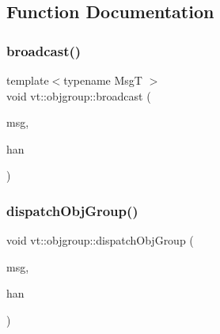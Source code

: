 \subsection{Function Documentation}
\mbox{\label{namespacevt_1_1objgroup_a1e6ef433bb1132944aba030b2a48d12d}} 
\subsubsection{\texorpdfstring{broadcast()}{broadcast()}}
{\footnotesize\ttfamily template$<$typename MsgT $>$ \\
void vt\+::objgroup\+::broadcast (\begin{DoxyParamCaption}\item[{\hyperlink{namespacevt_ab2b3d506ec8e8d1540aede826d84a239}{Msg\+Shared\+Ptr}$<$ MsgT $>$}]{msg,  }\item[{\hyperlink{namespacevt_af64846b57dfcaf104da3ef6967917573}{Handler\+Type}}]{han }\end{DoxyParamCaption})}

\mbox{\label{namespacevt_1_1objgroup_a8eab3eb6e73bbc92bce100e13a01a795}} 
\subsubsection{\texorpdfstring{dispatch\+Obj\+Group()}{dispatchObjGroup()}}
{\footnotesize\ttfamily void vt\+::objgroup\+::dispatch\+Obj\+Group (\begin{DoxyParamCaption}\item[{\hyperlink{namespacevt_ab2b3d506ec8e8d1540aede826d84a239}{Msg\+Shared\+Ptr}$<$ \hyperlink{namespacevt_a1125ac1da6c0bbf141e0ea0739d7602d}{Short\+Message} $>$}]{msg,  }\item[{\hyperlink{namespacevt_af64846b57dfcaf104da3ef6967917573}{Handler\+Type}}]{han }\end{DoxyParamCaption})}

\mbox{\label{namespacevt_1_1objgroup_aee19dffbee9f43f1a28d08f1c07996c7}} 
